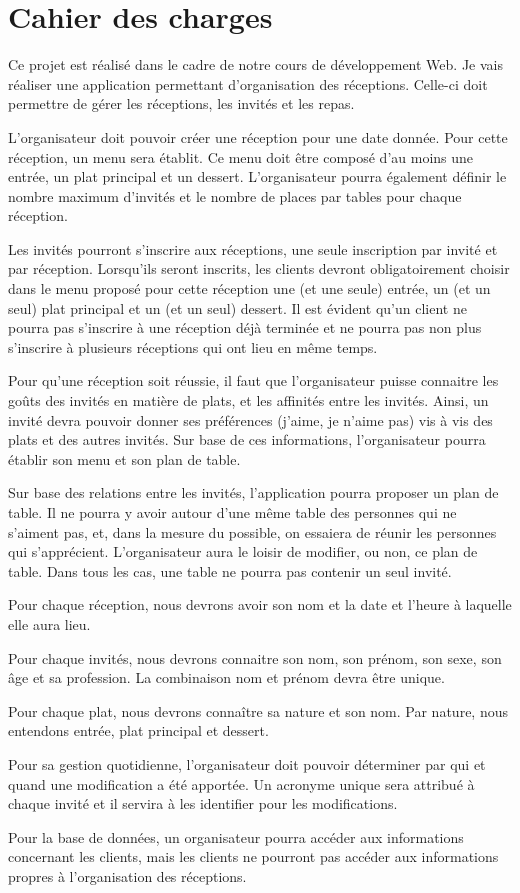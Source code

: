\section{Cahier des charges}

Ce projet est réalisé dans le cadre de notre cours de développement Web. Je vais réaliser une application permettant d'organisation des réceptions. Celle-ci doit permettre de gérer les réceptions, les invités et les repas.

L'organisateur doit pouvoir créer une réception pour une date donnée. Pour cette réception, un menu sera établit. Ce menu doit être composé d'au moins une entrée, un plat principal et un dessert. L'organisateur pourra également définir le nombre maximum d'invités et le nombre de places par tables pour chaque réception.

Les invités pourront s'inscrire aux réceptions, une seule inscription par invité et par réception. Lorsqu'ils seront inscrits, les clients devront obligatoirement choisir dans le menu proposé pour cette réception une (et une seule) entrée, un (et un seul) plat principal et un (et un seul) dessert. Il est évident qu'un client ne pourra pas s'inscrire à une réception déjà terminée et ne pourra pas non plus s'inscrire à plusieurs réceptions qui ont lieu en même temps.

Pour qu'une réception soit réussie, il faut que l'organisateur puisse connaitre les goûts des invités en matière de plats, et les affinités entre les invités. Ainsi, un invité devra pouvoir donner ses préférences (\og{}j'aime\fg{}, \og{}je n'aime pas\fg{}) vis à vis des plats et des autres invités. Sur base de ces informations, l'organisateur pourra établir son menu et son plan de table.

Sur base des relations entre les invités, l'application pourra proposer un plan de table. Il ne pourra y avoir autour d'une même table des personnes qui ne s'aiment pas, et, dans la mesure du possible, on essaiera de réunir les personnes qui s'apprécient. L'organisateur aura le loisir de modifier, ou non, ce plan de table. Dans tous les cas, une table ne pourra pas contenir un seul invité.

Pour chaque réception, nous devrons avoir son nom et la date et l'heure à laquelle elle aura lieu.

Pour chaque invités,  nous devrons connaitre son nom, son prénom, son sexe, son âge et sa profession. La combinaison \og{}nom\fg{} et \og{}prénom\fg{} devra être unique.

Pour chaque plat, nous devrons connaître sa nature et son nom. Par nature, nous entendons \og{}entrée\fg{}, \og{}plat principal\fg{} et \og{}dessert\fg{}.

Pour sa gestion quotidienne, l'organisateur doit pouvoir déterminer par qui et quand une modification a été apportée. Un acronyme unique sera attribué à chaque invité et il servira à les identifier pour les modifications.

Pour la base de données, un organisateur pourra accéder aux informations concernant les clients, mais les clients ne pourront pas accéder aux informations propres à l'organisation des réceptions.